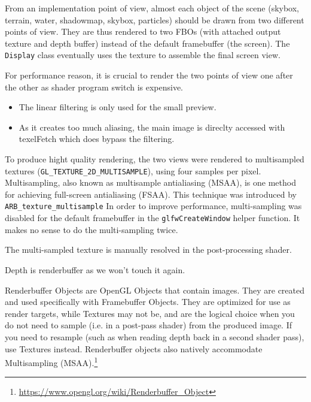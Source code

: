 \documentclass[a4paper,11pt]{article}
\begin{document}
From an implementation point of view, almost each object of the scene (skybox, terrain, water, shadowmap, skybox, particles) should be drawn from two different points of view. They are thus rendered to two FBOs (with attached output texture and depth buffer) instead of the default framebuffer (the screen). The \texttt{Display} class eventually uses the texture to assemble the final screen view.

For performance reason, it is crucial to render the two points of view one after the other as shader program switch is expensive.
\begin{itemize}
\item{The linear filtering is only used for the small preview.}
\item{ As it creates too much aliasing, the main image is direclty accessed with texelFetch which does bypass the filtering.}
\end{itemize}

To produce hight quality rendering, the two views were rendered to multisampled textures (\texttt{GL\_TEXTURE\_2D\_MULTISAMPLE}), using four samples per pixel. Multisampling, also known as multisample antialiasing (MSAA), is one method for achieving full-screen antialiasing (FSAA). This technique was introduced by \texttt{ARB\_texture\_multisample} In order to improve performance, multi-sampling was disabled for the default framebuffer in the \texttt{glfwCreateWindow} helper function. It makes no sense to do the multi-sampling twice.

The multi-sampled texture is manually resolved in the post-processing shader.

Depth is renderbuffer as we won't touch it again.

Renderbuffer Objects are OpenGL Objects that contain images. They are created and used specifically with Framebuffer Objects. They are optimized for use as render targets, while Textures may not be, and are the logical choice when you do not need to sample (i.e. in a post-pass shader) from the produced image. If you need to resample (such as when reading depth back in a second shader pass), use Textures instead. Renderbuffer objects also natively accommodate Multisampling (MSAA).\footnote{\url{https://www.opengl.org/wiki/Renderbuffer\_Object}}
\end{document}
